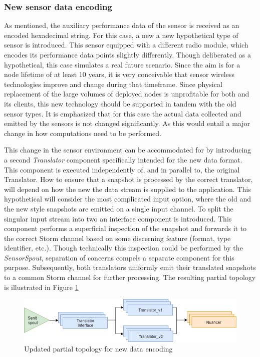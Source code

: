 \subsubsection{New sensor data encoding}
As mentioned, the auxiliary performance data of the sensor is received as an encoded hexadecimal string. For this case, a new a new hypothetical type of sensor is introduced. This sensor equipped with a different radio module, which encodes its performance data points slightly differently. Though deliberated as a hypothetical, this case simulates a real future scenario. Since the aim is for a node lifetime of at least 10 years, it is very conceivable that sensor wireless technologies improve and change during that timeframe. Since physical replacement of the large volumes of deployed nodes is unprofitable for both \nedap and its clients, this new technology should be supported in tandem with the old sensor types. It is emphasized that for this case the actual data collected and emitted by the sensors is not changed significantly. As this would entail a major change in how computations need to be performed.

This change in the sensor environment can be accommodated for by introducing a second \emph{Translator} component specifically intended for the new data format. This component is executed independently of, and in parallel to, the original Translator. How to ensure that a snapshot is processed by the correct translator, will depend on how the new the data stream is supplied to the application. This hypothetical will consider the most complicated input option, where the old and the new style snapshots are emitted on a single input channel. To split the singular input stream into two an interface component is introduced. This component performs a superficial inspection of the snapshot and forwards it to the correct Storm channel based on some discerning feature (format, type identifier, etc.). Though technically this inspection could be performed by the \emph{SensorSpout}, separation of concerns compels a separate component for this purpose. Subsequently, both translators uniformly emit their translated snapshots to a common Storm channel for further processing. The resulting partial topology is illustrated in Figure \ref{fig:update_encoding}

\begin{figure}
\centering
\includegraphics[width=\textwidth]{resources/img/update_encoding.png}
\caption{Updated partial topology for new data encoding}
\label{fig:update_encoding}
\end{figure}

